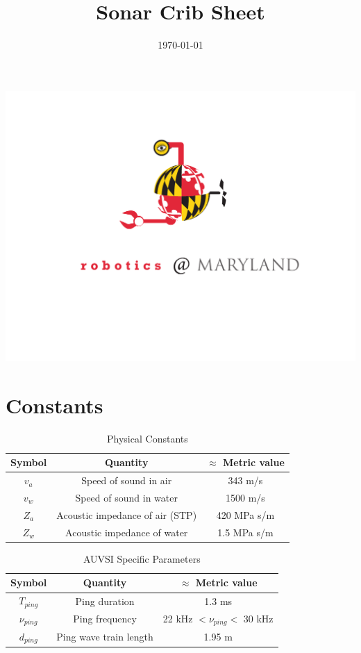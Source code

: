 \documentclass[10pt]{amsart}
\title{\huge{Sonar Crib Sheet}}
\date{\today}
\begin{document}
\begin{center}
\includegraphics[scale=0.4]{robocrab.pdf}
\end{center}
\maketitle


\section{Constants}


\begin{table}[h]
\caption{Physical Constants}
\begin{tabular}{|c|c c|}
\hline\hline
Symbol	&	Quantity							& \(\approx\) Metric value \\
\hline
\(v_a\)	& Speed of sound in air				& 343 m/s	 	\\
\(v_w\)	& Speed of sound in water			& 1500 m/s		\\
\(Z_a\)	& Acoustic impedance of air (STP)	& 420 MPa s/m	\\
\(Z_w\) & Acoustic impedance of water		  & 1.5 MPa s/m	\\
\hline
\end{tabular}
\label{tab:PhysicalConstants}
\end{table}


\begin{table}[h]
\caption{AUVSI Specific Parameters}
\begin{tabular}{|c|c c|}
\hline\hline
Symbol	&	Quantity							& \(\approx\) Metric value \\
\hline
\(T_{ping}\)	& Ping duration						& 1.3 ms		 	\\
\(\nu_{ping}\)	& Ping frequency					& 22 kHz \(< \nu_{ping} <\) 30 kHz \\
\(d_{ping}\)	& Ping wave train length			& 1.95 m \\
\hline
\end{tabular}
\label{tab:PhysicalConstants}
\end{table}
\end{document}
